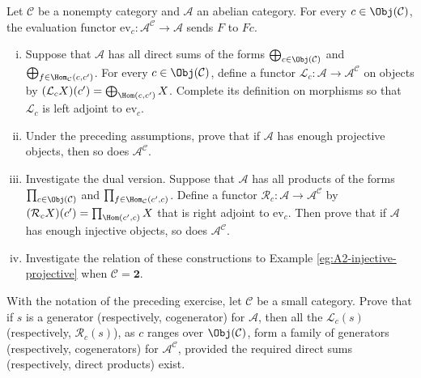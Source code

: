 \begin{Exercises}
	\item Let $\mathcal{C}$ be a nonempty category and $\mathcal{A}$ an
	abelian category. For every $c\in\Obj(\mathcal{C})$, the evaluation functor
	$\mathrm{ev}_c:\mathcal{A}^{\mathcal{C}}\to\mathcal{A}$ sends $F$ to
	$Fc$.
	\begin{enumerate}[(i)]
		\item Suppose that $\mathcal{A}$ has all direct sums of the forms
		$\bigoplus_{c\in\Obj(\mathcal{C})}$ and
		$\bigoplus_{f\in\Hom_{\mathcal{C}}(c,c')}$. For every
		$c\in\Obj(\mathcal{C})$, define a functor
		$\mathcal{L}_c:\mathcal{A}\to\mathcal{A}^{\mathcal{C}}$ on objects by
		$(\mathcal{L}_cX)(c')=\bigoplus_{\Hom(c,c')}X$. Complete its definition
		on morphisms so that $\mathcal{L}_c$ is left adjoint to
		$\mathrm{ev}_c$.
		\item Under the preceding assumptions, prove that if $\mathcal{A}$ has
		enough projective objects, then so does $\mathcal{A}^{\mathcal{C}}$.
		\item Investigate the dual version. Suppose that $\mathcal{A}$ has all
		products of the forms $\prod_{c\in\Obj(\mathcal{C})}$ and
		$\prod_{f\in\Hom_{\mathcal{C}}(c',c)}$. Define a functor
		$\mathcal{R}_c:\mathcal{A}\to\mathcal{A}^{\mathcal{C}}$ by
		$(\mathcal{R}_cX)(c')=\prod_{\Hom(c',c)}X$ that is right adjoint to
		$\mathrm{ev}_c$. Then prove that if $\mathcal{A}$ has enough injective
		objects, so does $\mathcal{A}^{\mathcal{C}}$.
		\item Investigate the relation of these constructions to Example
		\ref{eg:A2-injective-projective} when $\mathcal{C}=\mathbf{2}$.
	\end{enumerate}

	\item With the notation of the preceding exercise, let $\mathcal{C}$ be a
	small category. Prove that if $s$ is a generator (respectively,
	cogenerator) for $\mathcal{A}$, then all the $\mathcal{L}_c(s)$
	(respectively, $\mathcal{R}_c(s)$), as $c$ ranges over
	$\Obj(\mathcal{C})$, form a family of generators (respectively,
	cogenerators) for $\mathcal{A}^{\mathcal{C}}$, provided the required direct
	sums (respectively, direct products) exist.


\end{Exercises}
